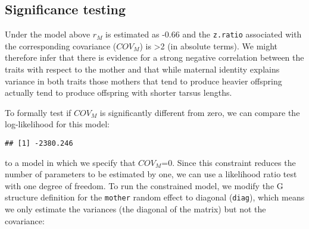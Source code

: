 \documentclass[12pt,]{book}
\newenvironment{Shaded}{\begin{snugshade}}{\end{snugshade}}
\newcommand{\NormalTok}[1]{#1}
\newcommand{\OperatorTok}[1]{\textcolor[rgb]{0.81,0.36,0.00}{\textbf{#1}}}
\begin{document}
\hypertarget{significance-testing}{%
\subsection{Significance testing}\label{significance-testing}}

Under the model above \(r_M\) is estimated as -0.66 and the \texttt{z.ratio} associated with the corresponding covariance (\(COV_M\)) is \textgreater{}2 (in absolute terms). We might therefore infer that there is evidence for a strong negative correlation between the traits with respect to the mother and that while maternal identity explains variance in both traits those mothers that tend to produce heavier offspring actually tend to produce offspring with shorter tarsus lengths.

To formally test if \(COV_M\) is significantly different from zero, we can compare the log-likelihood for this model:

\begin{Shaded}
\end{Shaded}

\begin{verbatim}
## [1] -2380.246
\end{verbatim}

to a model in which we specify that \(COV_M\)=0. Since this constraint reduces the number of parameters to be estimated by one, we can use a likelihood ratio test with one degree of freedom. To run the constrained model, we modify the G structure definition for the \texttt{mother} random effect to diagonal (\texttt{diag}), which means we only estimate the variances (the diagonal of the matrix) but not the covariance:
\end{document}
